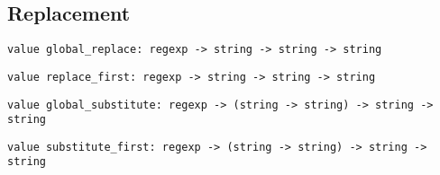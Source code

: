 \subsection*{Replacement }\begin{verbatim}
value global_replace: regexp -> string -> string -> string
\end{verbatim}
%
\begin{comment}
 \verbglobal_replace regexp s repl returns a string identical to \verbs,
           except that all substrings of \verbs that match \verbregexp have been
           replaced by \verbrepl. The replacement text \verbrepl can contain
           \verb\1, \verb\2, etc; these sequences will be replaced by the text
           matched by the corresponding group in the regular expression.
           \verb\0 stands for the text matched by the whole regular expression. 
\end{comment}
\begin{verbatim}
value replace_first: regexp -> string -> string -> string
\end{verbatim}
%
\begin{comment}
 Same as \verbglobal_replace, except that only the first substring
           matching the regular expression is replaced. 
\end{comment}
\begin{verbatim}
value global_substitute: regexp -> (string -> string) -> string -> string
\end{verbatim}
%
\begin{comment}
 \verbglobal_substitute regexp subst s returns a string identical
           to \verbs, except that all substrings of \verbs that match \verbregexp
           have been replaced by the result of function \verbsubst. The
           function \verbsubst is called once for each matching substring,
           and receives \verbs (the whole text) as argument. 
\end{comment}
\begin{verbatim}
value substitute_first: regexp -> (string -> string) -> string -> string
\end{verbatim}
%
\begin{comment}
 Same as \verbglobal_substitute, except that only the first substring
           matching the regular expression is replaced. 
\end{comment}
